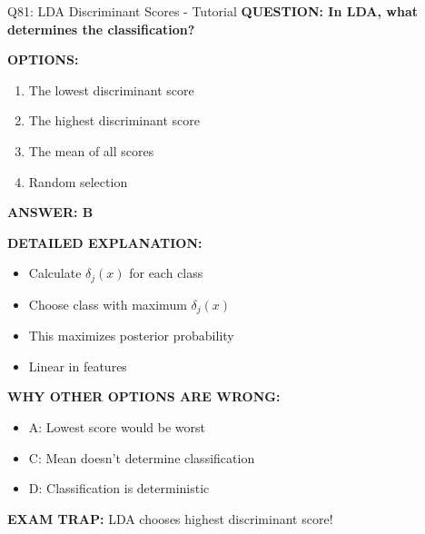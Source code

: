 \documentclass[8pt]{beamer}
\begin{document}
	\begin{frame}{Q81: LDA Discriminant Scores - Tutorial}
		\fontsize{6.5}{7.5}\selectfont
		\textbf{QUESTION: In LDA, what determines the classification?}
		
		\vspace{0.1cm}
		\textbf{OPTIONS:}
		\begin{enumerate}
			\item The lowest discriminant score
			\item The highest discriminant score
			\item The mean of all scores
			\item Random selection
		\end{enumerate}
		
		\vspace{0.1cm}
		\textcolor{myblue}{\textbf{ANSWER: B}}
		
		\vspace{0.1cm}
		\textbf{DETAILED EXPLANATION:}
		\begin{itemize}
			\item Calculate $\delta_j(x)$ for each class
			\item Choose class with maximum $\delta_j(x)$
			\item This maximizes posterior probability
			\item Linear in features
		\end{itemize}
		
		\vspace{0.1cm}
		\textcolor{myred}{\textbf{WHY OTHER OPTIONS ARE WRONG:}}
		\begin{itemize}
			\item \textcolor{myred}{A:} Lowest score would be worst
			\item \textcolor{myred}{C:} Mean doesn't determine classification
			\item \textcolor{myred}{D:} Classification is deterministic
		\end{itemize}
		
		\textcolor{myred}{\textbf{EXAM TRAP:}} LDA chooses \textcolor{myblue}{highest discriminant score}!
	\end{frame}
	
\end{document}
